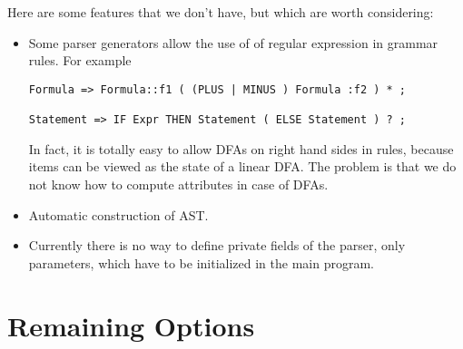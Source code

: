 \documentclass{article}
\begin{document}
Here are some features that we don't have, but which
are worth considering:
\begin{itemize}
\item
Some parser generators allow the use of of regular expression in grammar rules.
For example 
\begin{verbatim}
Formula => Formula::f1 ( (PLUS | MINUS ) Formula :f2 ) * ; 

Statement => IF Expr THEN Statement ( ELSE Statement ) ? ; \end{verbatim}
In fact, it is totally easy to allow DFAs on right hand sides in rules,
because items can be viewed as the state of a linear DFA. 
The problem is that we do not know how to compute attributes
in case of DFAs. 

\item
   Automatic construction of AST.

\item  
   Currently there is no way to define private fields of the parser,
   only parameters, which have to be initialized in the main program.

\end{itemize}


\section{Remaining Options}
\label{Sect_remaining}
\end{document}

